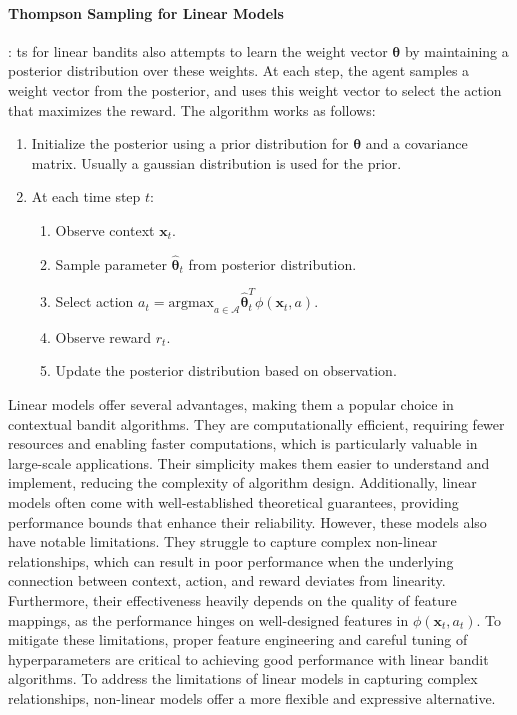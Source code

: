 \paragraph{Thompson Sampling for Linear Models}: \acf{ts} for linear bandits also attempts to learn the weight vector $\boldsymbol{\theta}$ by maintaining a posterior distribution over these weights. At each step, the agent samples a weight vector from the posterior, and uses this weight vector to select the action that maximizes the reward. The algorithm works as follows:
    \begin{enumerate}
    \item Initialize the posterior using a prior distribution for $\boldsymbol{\theta}$ and a covariance matrix. Usually a gaussian distribution is used for the prior.
    \item At each time step $t$:
      \begin{enumerate}
        \item Observe context $\mathbf{x}_t$.
        \item Sample parameter $\hat{\boldsymbol{\theta}}_t$ from posterior distribution.
        \item Select action $a_t = \text{argmax}_{a \in \mathcal{A}} \hat{\boldsymbol{\theta}}_t^T \phi(\mathbf{x}_t, a)$.
        \item Observe reward $r_t$.
        \item Update the posterior distribution based on observation.
      \end{enumerate}
    \end{enumerate}

Linear models offer several advantages, making them a popular choice in contextual bandit algorithms. They are computationally efficient, requiring fewer resources and enabling faster computations, which is particularly valuable in large-scale applications. Their simplicity makes them easier to understand and implement, reducing the complexity of algorithm design. Additionally, linear models often come with well-established theoretical guarantees, providing performance bounds that enhance their reliability. However, these models also have notable limitations. They struggle to capture complex non-linear relationships, which can result in poor performance when the underlying connection between context, action, and reward deviates from linearity. Furthermore, their effectiveness heavily depends on the quality of feature mappings, as the performance hinges on well-designed features in $\phi(\mathbf{x}_t, a_t)$. To mitigate these limitations, proper feature engineering and careful tuning of hyperparameters are critical to achieving good performance with linear bandit algorithms.
To address the limitations of linear models in capturing complex relationships, non-linear models offer a more flexible and expressive alternative. 


